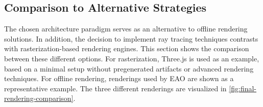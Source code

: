 \newpage
\subsection*{Comparison to Alternative Strategies}

The chosen architecture paradigm serves as an alternative to offline rendering solutions. In addition, the decision to implement ray tracing techniques contrasts with rasterization-based rendering engines. This section shows the comparison between these different options. For rasterization, \gls{Three.js} is used as an example, based on a minimal setup without pregenerated artifacts or advanced rendering techniques. For offline rendering,  renderings used by EAO are shown as a representative example. The three different renderings are visualized in \autoref{fig:final-rendering-comparison}.

